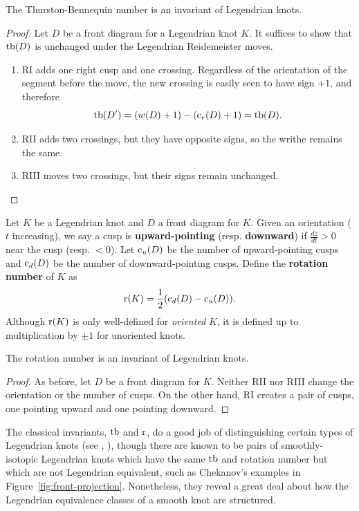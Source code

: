 \begin{proposition}
    The Thurston-Bennequin number is an invariant of Legendrian knots.
\end{proposition}
\begin{proof}
    Let $D$ be a front diagram for a Legendrian knot $K$. It suffices to show that $\operatorname{tb}(D)$ is unchanged under the Legendrian Reidemeister moves.

    \begin{enumerate}
        \item RI adds one right cusp and one crossing. Regardless of the orientation of the segment before the move, the new crossing is easily seen to have sign $+1$, and therefore
            \[
                \operatorname{tb}(D') = (w(D) + 1) - (\operatorname{c}_r(D) + 1) = \operatorname{tb}(D).
            \]
        \item RII adds two crossings, but they have opposite signs, so the writhe remains the same.
        \item RIII moves two crossings, but their signs remain unchanged.
    \end{enumerate}
    
\end{proof}

\begin{definition}
    Let $K$ be a Legendrian knot and $D$ a front diagram for $K$.
    Given an orientation ($t$ increasing), we say a cusp is \textbf{upward-pointing} (resp. \textbf{downward}) if $\frac{dz}{dt} > 0$ near the cusp (resp. $< 0$).
    Let $\operatorname{c}_u(D)$ be the number of upward-pointing cusps and $\operatorname{c}_d(D)$ be the number of downward-pointing cusps. Define the \textbf{rotation number} of $K$ as 
    \[
        \operatorname{r}(K) = \frac{1}{2} (\operatorname{c}_d(D) - \operatorname{c}_u(D)).
    \]
    Although $\operatorname{r}(K)$ is only well-defined for \emph{oriented} $K$, it is defined up to multiplication by $\pm 1$ for unoriented knots.
\end{definition}
\begin{proposition}
    The rotation number is an invariant of Legendrian knots.
\end{proposition}
\begin{proof}
    As before, let $D$ be a front diagram for $K$. Neither RII nor RIII change the orientation or the number of cusps. On the other hand, RI creates a pair of cusps, one pointing upward and one pointing downward.
\end{proof}

The classical invariants, $\operatorname{tb}$ and $\operatorname{r}$, do a good job of distinguishing certain types of Legendrian knots  (see \cite{eliashberg2008unknot}, \cite{etnyrehonda}), though there are known to be pairs of smoothly-isotopic Legendrian knots which have the same $\operatorname{tb}$ and rotation number but which are not Legendrian equivalent, such as Chekanov's examples \cite{chekanov} in Figure~\ref{fig:front-projection}. Nonetheless, they reveal a great deal about how the Legendrian equivalence classes of a smooth knot are structured. 

